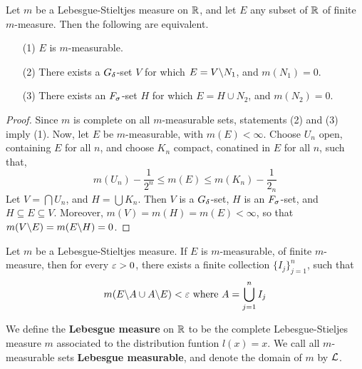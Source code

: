 \begin{theorem}\label{theorem_1.4.6}
    Let $m$ be a Lebesgue-Stieltjes measure on $\mathbb{R}$, and let $E$ any subset of
    $\mathbb{R}$ of finite $m$-measure. Then the following are equivalent.
    \begin{enumerate}
        \item[(1)] $E$ is $m$-measurable.

        \item[(2)] There exists a $G_\delta$-set $V$ for which $E=V \backslash N_1$, and
            $m(N_1)=0$.

        \item[(3)] There exists an $F_\sigma$-set  $H$ for which  $E=H \cup N_2$,
            and $m(N_2)=0$.
    \end{enumerate}
\end{theorem}
\begin{proof}
    Since $m$ is complete on all $m$-measurable sets, statements (2) and (3)
    imply (1). Now, let $E$ be $m$-measurable, with $m(E)<\infty$. Choose $U_n$
    open, containing $E$ for all  $n$, and choose  $K_n$ compact, conatined in
    $E$ for all  $n$, such that,
    \begin{equation*}
        m(U_n)-\frac{1}{2^n} \leq m(E) \leq m(K_n)-\frac{1}{2_n}
    \end{equation*}
    Let $V=\bigcap{U_n}$, and $H=\bigcup{K_n}$. Then $V$ is a $G_\delta$-set, $H$ is
    an $F_\sigma$-set, and $H \subseteq E \subseteq V$. Moreover,
    $m(V)=m(H)=m(E)<\infty$, so that $m(V \backslash E)=m(E \backslash H)=0$.
\end{proof}

\begin{lemma}\label{lemma_1.4.7}
    Let $m$ be a Lebesgue-Stieltjes measure. If $E$ is $m$-measurable, of finite
     $m$-measure, then for every  $\varepsilon>0$, there exists a finite collection
     $\{I_j\}_{j=1}^n$, such that
     \begin{equation}\label{equation_1.12}
         m(E \backslash A \cup A \backslash E)<\varepsilon \text{ where } A=\bigcup_{j=1}^n{I_j}
     \end{equation}
\end{lemma}

\begin{definition}
    We define the \textbf{Lebesgue measure} on $\mathbb{R}$ to be the complete
    Lebesgue-Stieljes measure $m$ associated to the distribution funtion
    $l(x)=x$. We call all $m$-measurable sets \textbf{Lebesgue measurable}, and
    denote the domain of $m$ by $\mathcal{L}$.
\end{definition}

